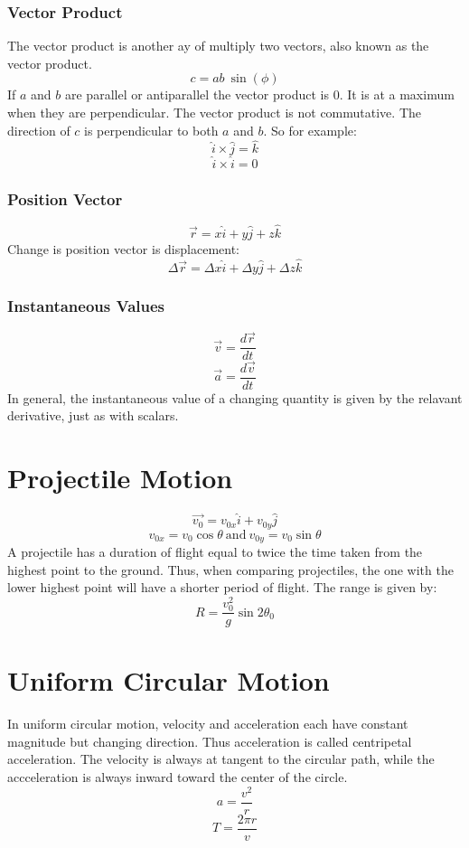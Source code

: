 \documentclass[12pt]{report}
\begin{document}
\begin{flushleft}
\subsubsection*{Vector Product}

The vector product is another ay of multiply two vectors, also known as the vector product.
\[c = ab\:\sin(\phi)\]
If \(a\) and \(b\) are parallel or antiparallel the vector product is \(0\). It is at a maximum
when they are perpendicular. The vector product is not commutative. The direction of \(c\)
is perpendicular to both \(a\) and \(b\). So for example:
\[\hat{i} \times \hat{j} = \hat{k}\]
\[\hat{i} \times \hat{i} = 0\]

\subsubsection*{Position Vector}
\[\vec{r} = x\hat{i} + y\hat{j} +z\hat{k}\]
Change is position vector is displacement:
\[\Delta\vec{r} = \Delta x \hat{i} + \Delta y \hat{j} + \Delta z \hat{k}\]

\subsubsection*{Instantaneous Values}
\[\vec{v} = \frac{d\vec{r}}{dt}\]
\[\vec{a} = \frac{d\vec{v}}{dt}\]
In general, the instantaneous value of a changing quantity is given by the relavant
derivative, just as with scalars.

\section*{Projectile Motion}
\[\vec{v_0} = v_{0x}\hat{i} + v_{0y}\hat{j}\]
\[v_{0x} = v_0\cos{\theta} \:\mathrm{and}\: v_{0y} = v_0\sin{\theta}\]
A projectile has a duration of flight equal to twice the time taken from the highest point to 
the ground. Thus, when comparing projectiles, the one with the lower highest point will
have a shorter period of flight. The range is given by:
\[R = \frac{v^2_0}{g}\sin 2 \theta_0\]

\section*{Uniform Circular Motion}
In uniform circular motion, velocity and acceleration each have constant magnitude but changing direction.
Thus acceleration is called centripetal acceleration. The velocity is always at tangent to the circular
path, while the accceleration is always inward toward the center of the circle.
\[a = \frac{v^2}{r}\]
\[T = \frac{2\pi r}{v}\]


\end{flushleft}
\end{document}
